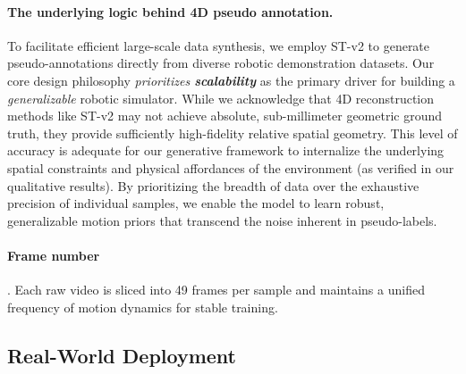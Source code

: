 \begin{appendices}
\paragraph{The underlying logic behind 4D pseudo annotation.}
To facilitate efficient large-scale data synthesis, we employ ST-v2 \cite{xiao2025spatialtracker} to generate pseudo-annotations directly from diverse robotic demonstration datasets. Our core design philosophy \textit{prioritizes \textbf{scalability}} as the primary driver for building a \textit{generalizable} robotic simulator. While we acknowledge that 4D reconstruction methods like ST-v2 may not achieve absolute, sub-millimeter geometric ground truth, they provide sufficiently high-fidelity relative spatial geometry. This level of accuracy is adequate for our generative framework to internalize the underlying spatial constraints and physical affordances of the environment (as verified in our qualitative results). By prioritizing the breadth of data over the exhaustive precision of individual samples, we enable the model to learn robust, generalizable motion priors that transcend the noise inherent in pseudo-labels.

\paragraph{Frame number}.
Each raw video is sliced into 49 frames per sample and maintains a unified frequency of motion dynamics for stable training.

\subsection{Real-World Deployment}

\end{appendices}
